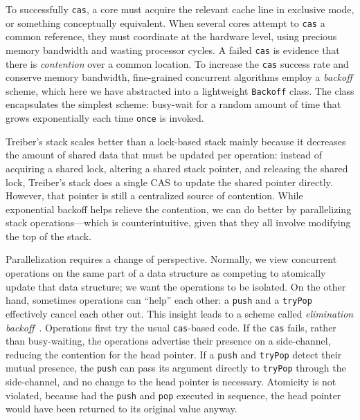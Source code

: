 \documentclass[preprint,nocopyrightspace]{sigplanconf}
\begin{document}
To successfully \lstinline{cas}, a core must acquire the relevant cache line in
exclusive mode, or something conceptually equivalent.  When
several cores attempt to \lstinline{cas} a common reference, they must
coordinate at the hardware level, using precious memory bandwidth and wasting
processor cycles.  A failed \lstinline{cas} is evidence that there is
\emph{contention} over a common location.  To increase the \lstinline{cas}
success rate and conserve memory bandwidth, fine-grained concurrent algorithms
employ a \emph{backoff} scheme, which here we have abstracted into a lightweight
\lstinline{Backoff} class.  The class encapsulates the simplest scheme:
busy-wait for a random amount of time that grows exponentially each time
\lstinline{once} is invoked.  



Treiber's stack scales better than a lock-based stack mainly because it
decreases the amount of shared data that must be updated per operation: instead
of acquiring a shared lock, altering a shared stack pointer, and releasing the
shared lock, Treiber's stack does a single CAS to update the shared pointer
directly.  However, that pointer is still a centralized source of contention.
While exponential backoff helps relieve the contention, we can do better by
parallelizing stack operations---which is counterintuitive, given that they all
involve modifying the top of the stack.

Parallelization requires a change of perspective.  Normally, we view concurrent
operations on the same part of a data structure as competing to atomically
update that data structure; we want the operations to be isolated.  On the other
hand, sometimes operations can ``help'' each other: a \lstinline{push} and a
\lstinline{tryPop} effectively cancel each other out.  This insight leads to a
scheme called \emph{elimination backoff}~\cite{Shavit1997a,Hendler2004}.
Operations first try the usual \lstinline{cas}-based code.  If the
\lstinline{cas} fails, rather than busy-waiting, the operations advertise their
presence on a side-channel, reducing the contention for the head pointer.  If a
\lstinline{push} and \lstinline{tryPop} detect their mutual presence, the
\lstinline{push} can pass its argument directly to \lstinline{tryPop} through
the side-channel, and no change to the head pointer is necessary.  Atomicity is
not violated, because had the \lstinline{push} and \lstinline{pop} executed in
sequence, the head pointer would have been returned to its original value
anyway.
\end{document}
